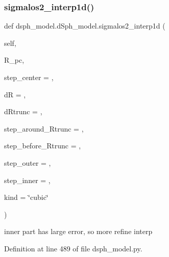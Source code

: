 \subsubsection{\texorpdfstring{sigmalos2\+\_\+interp1d()}{sigmalos2\_interp1d()}}
{\footnotesize\ttfamily def dsph\+\_\+model.\+d\+Sph\+\_\+model.\+sigmalos2\+\_\+interp1d (\begin{DoxyParamCaption}\item[{}]{self,  }\item[{}]{R\+\_\+pc,  }\item[{}]{step\+\_\+center = {},  }\item[{}]{dR = {},  }\item[{}]{d\+Rtrunc = {},  }\item[{}]{step\+\_\+around\+\_\+\+Rtrunc = {},  }\item[{}]{step\+\_\+before\+\_\+\+Rtrunc = {},  }\item[{}]{step\+\_\+outer = {},  }\item[{}]{step\+\_\+inner = {},  }\item[{}]{kind = {\ttfamily \char`\"{}cubic\char`\"{}} }\end{DoxyParamCaption})}

\begin{DoxyVerb}inner part has large error, so more refine interp
\end{DoxyVerb}
 

Definition at line 489 of file dsph\+\_\+model.\+py.


